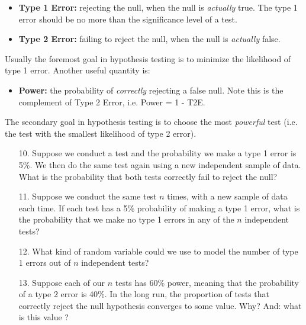 \documentclass[10pt]{extarticle}
\begin{document}
\begin{itemize}	
	\item {\bf Type 1 Error:} rejecting the null, when the null is {\it actually} true. The type 1 error should be no more than the significance level of a test.  
	\item {\bf Type 2 Error:} failing to reject the null, when the null is {\it actually} false. 
\end{itemize} 

Usually the foremost goal in hypothesis testing is to minimize the likelihood of type 1 error. Another useful quantity is:

\begin{itemize}
	\item {\bf Power:} the probability of {\it correctly} rejecting a false null.  Note this is the complement of Type 2 Error, i.e. Power = 1 - T2E. 
\end{itemize} 

The secondary goal in hypothesis testing is to choose the most {\it powerful} test (i.e. the test with the smallest likelihood of type 2 error). 

\hfill 

\begin{itemize}

	\item[10.] Suppose we conduct a test and the probability we make a type 1 error  is 5\%. We then do the same test again using a new independent sample of data. What is the probability that both tests correctly fail to reject the null? \\ 

	\item[11.] Suppose we conduct the same test $n$ times, with a new sample of data each time. If each test has a 5\% probability of making a type 1 error, what is the probability that we make no type 1 errors in any of the $n$ independent tests? \\ 

	\item[12.] What kind of random variable could we use to model the number of type 1 errors out of $n$ independent tests? \\ 

	\item[13.] Suppose each of our $n$ tests has 60\% power, meaning that the probability of a type 2 error is 40\%. In the long run, the proportion of tests that correctly reject the null hypothesis converges to some value. Why? And: what is this value ? \\

\end{itemize}
\end{document}
